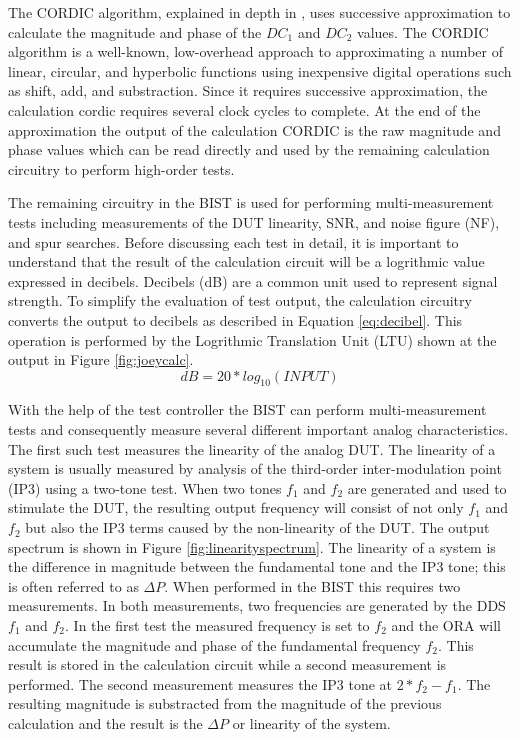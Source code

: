 \documentclass[12pt]{report}
\begin{document}
The CORDIC algorithm, explained in depth in \cite{joey}, uses successive approximation to calculate the magnitude and phase of the $DC_1$ and $DC_2$ values.  The CORDIC algorithm is a well-known, low-overhead approach to approximating a number of linear, circular, and hyperbolic functions using inexpensive digital operations such as shift, add, and substraction\cite{joey}.  Since it requires successive approximation, the calculation cordic requires several clock cycles to complete.  At the end of the approximation the output of the calculation CORDIC is the raw magnitude and phase values which can be read directly and used by the remaining calculation circuitry to perform high-order tests\cite{joey}.

The remaining circuitry in the BIST is used for performing multi-measurement tests including measurements of the DUT linearity, SNR, and noise figure (NF), and spur searches. Before discussing each test in detail, it is important to understand that the result of the calculation circuit will be a logrithmic value expressed in decibels.  Decibels (dB) are a common unit used to represent signal strength.  To simplify the evaluation of test output, the calculation circuitry converts the output to decibels as described in Equation \ref{eq:decibel}\cite{joey}.  This operation is performed by the Logrithmic Translation Unit (LTU) shown at the output in Figure \ref{fig:joeycalc}.  
\begin{equation}
dB = 20 * log_{10}(INPUT)
\label{eq:decibel}
\end{equation}

With the help of the test controller the BIST can perform multi-measurement tests and consequently measure several different important analog characteristics. The first such test measures the linearity of the analog DUT.  The linearity of a system is usually measured by analysis of the third-order inter-modulation point (IP3) using a two-tone test\cite{stroud-automaticlinearity}.  When two tones $f_1$ and $f_2$ are generated and used to stimulate the DUT, the resulting output frequency will consist of not only $f_1$ and $f_2$ but also the IP3 terms caused by the non-linearity of the DUT.  The output spectrum is shown in Figure \ref{fig:linearityspectrum}.  The linearity of a system is the difference in magnitude between the fundamental tone and the IP3 tone; this is often referred to as $\Delta P$\cite{stroud-automaticlinearity}.  When performed in the BIST this requires two measurements.  In both measurements, two frequencies are generated by the DDS $f_1$ and $f_2$.  In the first test the measured frequency is set to $f_2$ and the ORA will accumulate the magnitude and phase of the fundamental frequency $f_2$.  This result is stored in the calculation circuit while a second measurement is performed.  The second measurement measures the IP3 tone at $2*f_2-f_1$\cite{testtime}\cite{jie}.  The resulting magnitude is substracted from the magnitude of the previous calculation and the result is the $\Delta P$ or linearity of the system.
\end{document}
